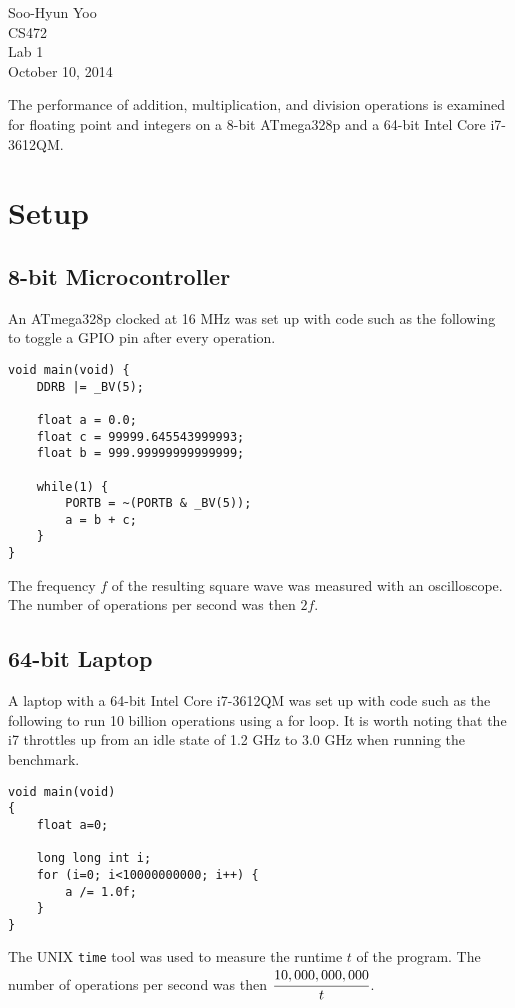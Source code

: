 \documentclass[12pt,letterpaper]{article}
\begin{document}
Soo-Hyun Yoo \\
CS472 \\
Lab 1\\
October 10, 2014

The performance of addition, multiplication, and division operations is
examined for floating point and integers on a 8-bit ATmega328p and a 64-bit
Intel Core i7-3612QM.

\section*{Setup}

\subsection*{8-bit Microcontroller}

An ATmega328p clocked at 16 MHz was set up with code such as the following to
toggle a GPIO pin after every operation.

\begin{verbatim}
void main(void) {
    DDRB |= _BV(5);

    float a = 0.0;
    float c = 99999.645543999993;
    float b = 999.99999999999999;

    while(1) {
        PORTB = ~(PORTB & _BV(5));
        a = b + c;
    }
}
\end{verbatim}

The frequency $f$ of the resulting square wave was measured with an
oscilloscope. The number of operations per second was then $2f$.

\subsection*{64-bit Laptop}

A laptop with a 64-bit Intel Core i7-3612QM was set up with code such as the
following to run 10 billion operations using a for loop. It is worth noting
that the i7 throttles up from an idle state of 1.2 GHz to 3.0 GHz when running
the benchmark.

\begin{verbatim}
void main(void)
{
    float a=0;

    long long int i;
    for (i=0; i<10000000000; i++) {
        a /= 1.0f;
    }
}
\end{verbatim}

The UNIX {\tt time} tool was used to measure the runtime $t$ of the program.
The number of operations per second was then $\cfrac{10,000,000,000}{t}$.
\end{document}
